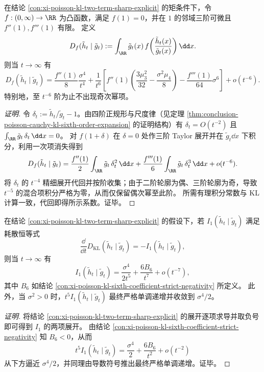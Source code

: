 \begin{conclusion}\label{con:xi-poisson-fdivergence-two-term-sharp}
在结论 \ref{con:xi-poisson-kl-two-term-sharp-explicit} 的矩条件下，令 \(f:(0,\infty)\to\RR\) 为凸函数，满足 \(f(1)=0\)，并在 \(1\) 的邻域三阶可微且 \(f''(1),f'''(1)\) 有限。
定义
\[
D_f(\tilde h_t\mid \tilde g_t):=\int_{\RR}\tilde g_t(x)\,f\!\left(\frac{\tilde h_t(x)}{\tilde g_t(x)}\right)\dd x.
\]
则当 \(t\to\infty\) 有
\[
D_f(\tilde h_t\mid \tilde g_t)
=\frac{f''(1)}{8}\frac{\sigma^4}{t^4}
+\frac1{t^6}\left[
f''(1)\!\left(\frac{3\mu_3^2}{32}-\frac{\sigma^2\mu_4}{8}\right)
-\frac{f'''(1)}{64}\sigma^6
\right]
+o(t^{-6}).
\]
特别地，至 \(t^{-6}\) 阶为止不出现奇次幂项。
\end{conclusion}
\begin{proof}[证明]
令 \(\delta_t:=\tilde h_t/\tilde g_t-1\)。由四阶正规形与尺度律（见定理 \ref{thm:conclusion-poisson-cauchy-kl-sixth-order-expansion} 的证明结构）有 \(\delta_t=O(t^{-2})\) 且 \(\int_{\RR}\tilde g_t\,\delta_t\,\dd x=0\)。
对 \(f(1+\delta)\) 在 \(\delta=0\) 处作三阶 Taylor 展开并在 \(\tilde g_t\dd x\) 下积分，利用一次项消失得到
\[
D_f(\tilde h_t\mid \tilde g_t)
=\frac{f''(1)}{2}\int_{\RR}\tilde g_t\,\delta_t^2\,\dd x
+\frac{f'''(1)}{6}\int_{\RR}\tilde g_t\,\delta_t^3\,\dd x
+o(t^{-6}).
\]
将 \(\delta_t\) 的 \(t^{-4}\) 精细展开代回并按阶收集；由于二阶轮廓为偶、三阶轮廓为奇，导致 \(t^{-5}\) 的混合项积分严格为零，从而仅保留偶次幂至此阶。
所需有理积分常数与 KL 计算一致，代回即得所示系数。证毕。
\end{proof}

\begin{conclusion}\label{con:xi-poisson-i1-two-term-sharp}
在结论 \ref{con:xi-poisson-kl-two-term-sharp-explicit} 的假设下，若 \(I_1(\tilde h_t\mid \tilde g_t)\) 满足耗散恒等式
\[
\frac{\dd}{\dd t}D_{\mathrm{KL}}(\tilde h_t\mid \tilde g_t)=-I_1(\tilde h_t\mid \tilde g_t),
\]
则当 \(t\to\infty\) 有
\[
I_1(\tilde h_t\mid \tilde g_t)
=\frac{\sigma^4}{2t^5}
+\frac{6B_6}{t^7}
+o(t^{-7}),
\]
其中 \(B_6\) 如结论 \ref{con:xi-poisson-kl-sixth-coefficient-strict-negativity} 所定义。
此外，当 \(\sigma^2>0\) 时，\(t^5 I_1(\tilde h_t\mid \tilde g_t)\) 最终严格单调递增并收敛到 \(\sigma^4/2\)。
\end{conclusion}
\begin{proof}[证明]
将结论 \ref{con:xi-poisson-kl-two-term-sharp-explicit} 的展开逐项求导并取负号即可得到 \(I_1\) 的两项展开。
由结论 \ref{con:xi-poisson-kl-sixth-coefficient-strict-negativity} 知 \(B_6<0\)，从而
\[
t^5I_1(\tilde h_t\mid \tilde g_t)=\frac{\sigma^4}{2}+\frac{6B_6}{t^2}+o(t^{-2})
\]
从下方逼近 \(\sigma^4/2\)，并同理由导数符号推出最终严格单调递增。证毕。
\end{proof}

